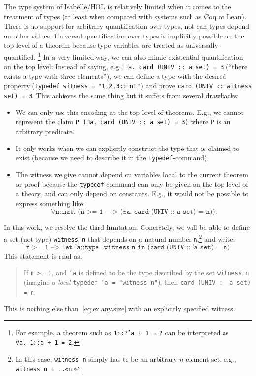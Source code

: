 \documentclass[11pt,a4paper]{article}
\begin{document}
The type system of Isabelle/HOL is relatively limited when it comes to the treatment of types (at least when compared with systems such as Coq or Lean).
There is no support for arbitrary quantification over types, not can types depend on other values.
Universal quantification over types is implicitly possible on the top level of a theorem because type variables are treated as universally quantified.%
\footnote{For example, a theorem such as \texttt{1::?'a + 1 = 2} can be interpreted as \texttt{∀a.~1::a + 1 = 2}.}
In a very limited way, we can also mimic existential quantification on the top level:
Instead of saying, e.g., \texttt{∃a.~card (UNIV :: a set) = 3} (``there exists a type with three elements''),
we can define a type with the desired property (\texttt{typedef witness = "{1,2,3::int}"}) and prove \texttt{card (UNIV :: witness set) = 3}. This achieves the same thing but it suffers from several drawbacks:
\begin{itemize}
\item We can only use this encoding at the top level of theorems. E.g., we cannot represent the claim \texttt{P (∃a.~card (UNIV :: a set) = 3)} where \texttt{P} is an arbitrary predicate.
\item It only works when we can explicitly construct the type that is claimed to exist (because we need to describe it in the \texttt{typedef}-command).
\item The witness we give cannot depend on variables local to the current theorem or proof because the \texttt{typedef} command can only be given on the top level of a theory, and can only depend on constants.
  E.g., it would not be possible to express something like:
  \begin{equation}\label{eq:ex.any.size}
    \texttt{∀n::nat. (n >= 1 ---> (∃a.~card (UNIV :: a set) = n))}.
  \end{equation}
\end{itemize}
In this work, we resolve the third limitation.
Concretely, we will be able to define a set (not type) \texttt{witness n} that depends on a natural number \texttt{n},\footnote{In this case, \texttt{witness n} simply has to be an arbitrary $n$-element set, e.g., \texttt{witness n = {..<n}}.}
and write:
\[
\texttt{n >= 1 --> let 'a::type=witness n in (card (UNIV :: 'a set) = n)} 
\]
This statement is read as:
\begin{quote}
  If \texttt{n >= 1}, and \texttt{'a} is defined to be the type described by the set \texttt{witness n}
  (imagine a \emph{local} \texttt{typedef 'a = "witness n"}), then \texttt{card (UNIV :: a set) = n}.
\end{quote}
This is nothing else than~\eqref{eq:ex.any.size} with an explicitly specified witness.
\end{document}
